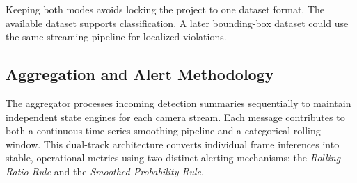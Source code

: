 \documentclass[conference]{IEEEtran}
\begin{document}
Keeping both modes avoids locking the project to one dataset format.
The available dataset supports classification. A later bounding-box
dataset could use the same streaming pipeline for localized violations.

\subsection{Aggregation and Alert Methodology}
\label{subsec:aggregation}

The aggregator processes incoming detection summaries sequentially to maintain independent state engines for each camera stream. Each message contributes to both a continuous time-series smoothing pipeline and a categorical rolling window. This dual-track architecture converts individual frame inferences into stable, operational metrics using two distinct alerting mechanisms: the \textit{Rolling-Ratio Rule} and the \textit{Smoothed-Probability Rule}.
\end{document}
